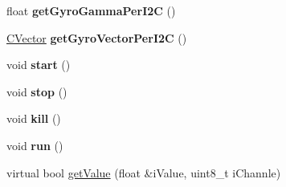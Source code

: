 \begin{DoxyCompactItemize}
\item 
\hypertarget{class_c_i_t_g3200_a6a314af93c90ed6611727defb5258add}{float {\bfseries get\-Gyro\-Gamma\-Per\-I2\-C} ()}\label{class_c_i_t_g3200_a6a314af93c90ed6611727defb5258add}

\item 
\hypertarget{class_c_i_t_g3200_aca6c12f7d87787bfa17b9e48a8355ec7}{\hyperlink{class_c_vector}{\-C\-Vector} {\bfseries get\-Gyro\-Vector\-Per\-I2\-C} ()}\label{class_c_i_t_g3200_aca6c12f7d87787bfa17b9e48a8355ec7}

\item 
\hypertarget{class_c_i_t_g3200_a6233d13f5eb6ca6d38a81a7f8747a352}{void {\bfseries start} ()}\label{class_c_i_t_g3200_a6233d13f5eb6ca6d38a81a7f8747a352}

\item 
\hypertarget{class_c_i_t_g3200_ab101046e2977f9e5839e369dd024d4a9}{void {\bfseries stop} ()}\label{class_c_i_t_g3200_ab101046e2977f9e5839e369dd024d4a9}

\item 
\hypertarget{class_c_i_t_g3200_a69a8e093640f59d2c049d75806943382}{void {\bfseries kill} ()}\label{class_c_i_t_g3200_a69a8e093640f59d2c049d75806943382}

\item 
\hypertarget{class_c_i_t_g3200_ad9eca5440ccc683bc1dd882ab601986d}{void {\bfseries run} ()}\label{class_c_i_t_g3200_ad9eca5440ccc683bc1dd882ab601986d}

\item 
virtual bool \hyperlink{class_c_i_t_g3200_ae7b2da2eb5e8e7569e5b697db2124650}{get\-Value} (float \&i\-Value, uint8\-\_\-t i\-Channle)
\end{DoxyCompactItemize}


